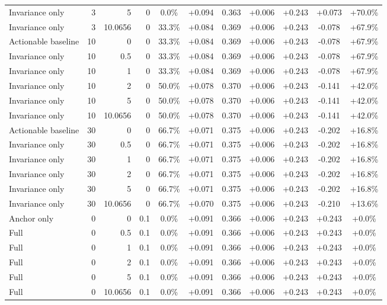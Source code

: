 \begin{table}[htbp]
\begin{tabular}{lrrrccccccc}
Invariance only & 3 & 5 & 0 & 0.0\% & +0.094 & 0.363 & +0.006 & +0.243 & +0.073 & +70.0\% \\
Invariance only & 3 & 10.0656 & 0 & 33.3\% & +0.084 & 0.369 & +0.006 & +0.243 & -0.078 & +67.9\% \\
Actionable baseline & 10 & 0 & 0 & 33.3\% & +0.084 & 0.369 & +0.006 & +0.243 & -0.078 & +67.9\% \\
Invariance only & 10 & 0.5 & 0 & 33.3\% & +0.084 & 0.369 & +0.006 & +0.243 & -0.078 & +67.9\% \\
Invariance only & 10 & 1 & 0 & 33.3\% & +0.084 & 0.369 & +0.006 & +0.243 & -0.078 & +67.9\% \\
Invariance only & 10 & 2 & 0 & 50.0\% & +0.078 & 0.370 & +0.006 & +0.243 & -0.141 & +42.0\% \\
Invariance only & 10 & 5 & 0 & 50.0\% & +0.078 & 0.370 & +0.006 & +0.243 & -0.141 & +42.0\% \\
Invariance only & 10 & 10.0656 & 0 & 50.0\% & +0.078 & 0.370 & +0.006 & +0.243 & -0.141 & +42.0\% \\
Actionable baseline & 30 & 0 & 0 & 66.7\% & +0.071 & 0.375 & +0.006 & +0.243 & -0.202 & +16.8\% \\
Invariance only & 30 & 0.5 & 0 & 66.7\% & +0.071 & 0.375 & +0.006 & +0.243 & -0.202 & +16.8\% \\
Invariance only & 30 & 1 & 0 & 66.7\% & +0.071 & 0.375 & +0.006 & +0.243 & -0.202 & +16.8\% \\
Invariance only & 30 & 2 & 0 & 66.7\% & +0.071 & 0.375 & +0.006 & +0.243 & -0.202 & +16.8\% \\
Invariance only & 30 & 5 & 0 & 66.7\% & +0.071 & 0.375 & +0.006 & +0.243 & -0.202 & +16.8\% \\
Invariance only & 30 & 10.0656 & 0 & 66.7\% & +0.070 & 0.375 & +0.006 & +0.243 & -0.210 & +13.6\% \\
Anchor only & 0 & 0 & 0.1 & 0.0\% & +0.091 & 0.366 & +0.006 & +0.243 & +0.243 & +0.0\% \\
Full & 0 & 0.5 & 0.1 & 0.0\% & +0.091 & 0.366 & +0.006 & +0.243 & +0.243 & +0.0\% \\
Full & 0 & 1 & 0.1 & 0.0\% & +0.091 & 0.366 & +0.006 & +0.243 & +0.243 & +0.0\% \\
Full & 0 & 2 & 0.1 & 0.0\% & +0.091 & 0.366 & +0.006 & +0.243 & +0.243 & +0.0\% \\
Full & 0 & 5 & 0.1 & 0.0\% & +0.091 & 0.366 & +0.006 & +0.243 & +0.243 & +0.0\% \\
Full & 0 & 10.0656 & 0.1 & 0.0\% & +0.091 & 0.366 & +0.006 & +0.243 & +0.243 & +0.0\% \\

\end{tabular}
\end{table}
